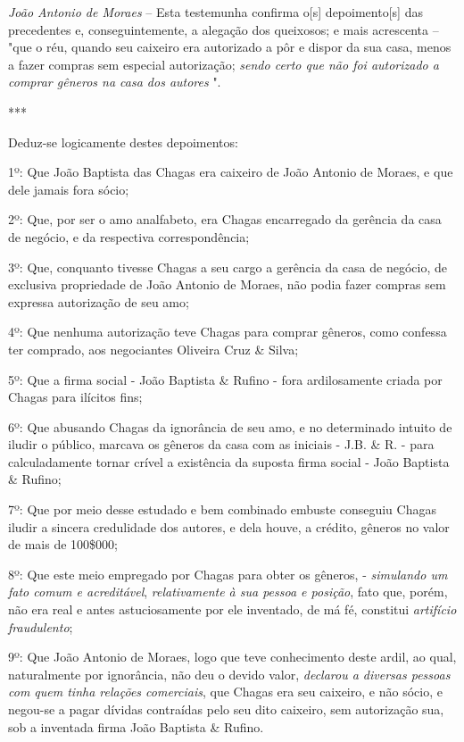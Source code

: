 \emph{João Antonio de Moraes} -- Esta testemunha confirma o{[}s{]}
depoimento{[}s{]} das precedentes e, conseguintemente, a alegação dos
queixosos; e mais acrescenta -- "que o réu, quando seu caixeiro era
autorizado a pôr e dispor da sua casa, menos a fazer compras sem
especial autorização; \emph{sendo certo que não foi autorizado a comprar
gêneros na casa dos autores} ".

***

Deduz-se logicamente destes depoimentos:

1º: Que João Baptista das Chagas era caixeiro de João Antonio de Moraes,
e que dele jamais fora sócio;

2º: Que, por ser o amo analfabeto, era Chagas encarregado da gerência da
casa de negócio, e da respectiva correspondência;

3º: Que, conquanto tivesse Chagas a seu cargo a gerência da casa de
negócio, de exclusiva propriedade de João Antonio de Moraes, não podia
fazer compras sem expressa autorização de seu amo;

4º: Que nenhuma autorização teve Chagas para comprar gêneros, como
confessa ter comprado, aos negociantes Oliveira Cruz \& Silva;

5º: Que a firma social - João Baptista \& Rufino - fora ardilosamente
criada por Chagas para ilícitos fins;

6º: Que abusando Chagas da ignorância de seu amo, e no determinado
intuito de iludir o público, marcava os gêneros da casa com as iniciais
- J.B. \& R. - para calculadamente tornar crível a existência da suposta
firma social - João Baptista \& Rufino;

7º: Que por meio desse estudado e bem combinado embuste conseguiu Chagas
iludir a sincera credulidade dos autores, e dela houve, a crédito,
gêneros no valor de mais de 100\$000;

8º: Que este meio empregado por Chagas para obter os gêneros, -
\emph{simulando um fato comum e acreditável}, \emph{relativamente à sua
pessoa e posição}, fato que, porém, não era real e antes astuciosamente
por ele inventado, de má fé, constitui \emph{artifício fraudulento};

9º: Que João Antonio de Moraes, logo que teve conhecimento deste ardil,
ao qual, naturalmente por ignorância, não deu o devido valor,
\emph{declarou a diversas pessoas com quem tinha relações comerciais},
que Chagas era seu caixeiro, e não sócio, e negou-se a pagar dívidas
contraídas pelo seu dito caixeiro, sem autorização sua, sob a inventada
firma João Baptista \& Rufino.

